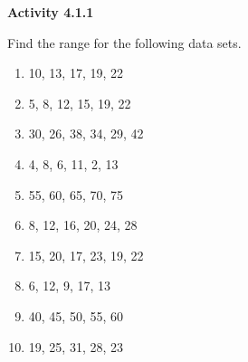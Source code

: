   \vspace{1ex}
\noindent\textbf{Activity 4.1.1}

\vspace{0.75ex}

Find the range for the following data sets.
\begin{multicols}{2}
\begin{enumerate}[noitemsep, label = \color{blue}\arabic*. ]
    \item 10, 13, 17, 19, 22
    \item 5, 8, 12, 15, 19, 22
    \item 30, 26, 38, 34, 29, 42
    \item 4, 8, 6, 11, 2, 13
    \item 55, 60, 65, 70, 75
    \item 8, 12, 16, 20, 24, 28
    \item 15, 20, 17, 23, 19, 22
    \item 6, 12, 9, 17, 13
    \item 40, 45, 50, 55, 60
    \item 19, 25, 31, 28, 23
\end{enumerate}
\end{multicols}
